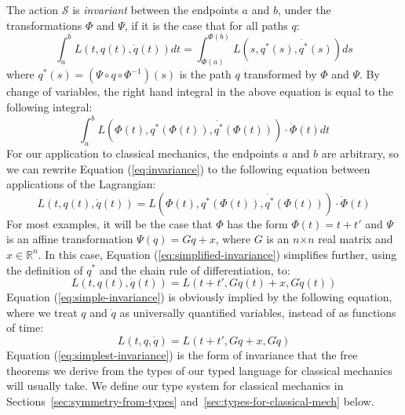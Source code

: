 \documentclass[preprint]{sigplanconf}
\theoremstyle{examplestyle}
\begin{document}
The action $\mathcal{S}$ is \emph{invariant} between the endpoints $a$
and $b$, under the transformations $\Phi$ and $\Psi$, if it is the
case that for all paths $q$:
\begin{equation}\label{eq:invariance}
    \int_a^b L(t,q(t),\dot{q}(t)) \mathit{dt}
    = \int_{\Phi(a)}^{\Phi(b)} L(s, q^*(s), \dot{q^*}(s)) \mathit{ds}
\end{equation}
where $q^*(s) = (\Psi \circ q \circ \Phi^{-1})(s)$ is the path $q$
transformed by $\Phi$ and $\Psi$.  By change of variables, the right
hand integral in the above equation is equal to the following
integral:
\begin{displaymath}
  \int_a^b L(\Phi(t), q^*(\Phi(t)), \dot{q^*}(\Phi(t)))\cdot \dot{\Phi}(t) \mathit{dt}
\end{displaymath}
For our application to classical mechanics, the endpoints $a$ and $b$
are arbitrary, so we can rewrite Equation (\ref{eq:invariance}) to the
following equation between applications of the Lagrangian:
\begin{equation}\label{eq:simplified-invariance}
  L(t,q(t),\dot{q}(t)) = L(\Phi(t), q^*(\Phi(t)), \dot{q^*}(\Phi(t)))\cdot \dot{\Phi}(t)
\end{equation}
For most examples, it will be the case that $\Phi$ has the form
$\Phi(t) = t + t'$ and $\Psi$ is an affine transformation $\Psi(q)
= Gq + x$, where $G$ is an $n\mathord\times n$ real matrix and $x \in
\mathbb{R}^n$. In this case, Equation (\ref{eq:simplified-invariance})
simplifies further, using the definition of $q^*$ and the chain rule
of differentiation, to:
\begin{equation}
  \label{eq:simple-invariance}
  L(t,q(t),\dot{q}(t)) = L(t + t', Gq(t) + x, G\dot{q}(t))
\end{equation}
Equation (\ref{eq:simple-invariance}) is obviously implied by the
following equation, where we treat $q$ and $\dot{q}$ as universally
quantified variables, instead of as functions of time:
\begin{equation}
  \label{eq:simplest-invariance}
  L(t,q,\dot{q}) = L(t + t', Gq + x, G\dot{q})
\end{equation}
Equation (\ref{eq:simplest-invariance}) is the form of invariance that
the free theorems we derive from the types of our typed language for
classical mechanics will usually take. We define our type system for
classical mechanics in Sections~\ref{sec:symmetry-from-types}
and~\ref{sec:types-for-classical-mech} below.
\end{document}
